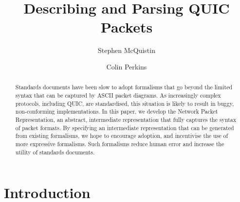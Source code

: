 \documentclass[10pt,sigconf]{acmart}
\begin{document}
\title{Describing and Parsing QUIC Packets}

\author{Stephen McQuistin}

\author{Colin Perkins}

\begin{abstract}


Standards documents have been slow to adopt formalisms that go beyond the limited syntax
that can be captured by ASCII packet diagrams. As increasingly complex protocols,
including QUIC, are standardised, this situation is likely to result in buggy,
non-conforming implementations. In this paper, we develop the Network Packet Representation,
an abstract, intermediate representation that fully captures the syntax of
packet formats. By specifying an intermediate representation that can be generated from
existing formalisms, we hope to encourage adoption, and incentivise the use of more
expressive formalisms. Such formalisms reduce human error and increase the utility of standards documents.

\end{abstract}
\maketitle
\section{Introduction}

%
\end{document}
